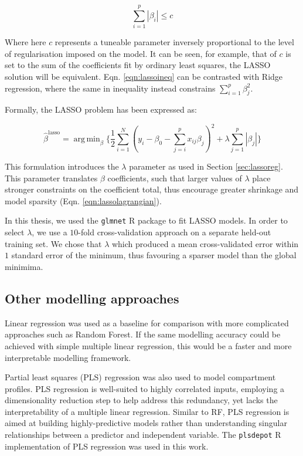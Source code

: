 \documentclass[a4paper,11pt,oneside]{book}
\DeclareMathOperator*{\argmin}{arg\,min}
\begin{document}
\begin{equation}\label{eqn:lassoineq}
\sum\limits_{i=1}^{p} |\beta_i| \leq c
\end{equation} \vspace{.2em}

Where here $c$ represents a tuneable parameter inversely proportional to the level of regularisation imposed on the model. It can be seen, for example, that of $c$ is set to the sum of the coefficients fit by ordinary least squares, the LASSO solution will be equivalent. Eqn. \ref{eqn:lassoineq} can be contrasted with Ridge regression, where the same in inequality instead constrains $\sum_{i=1}^{p} \beta_j^2$.

Formally, the LASSO problem has been expressed as:\cite{Hastie2001}

\begin{equation}\label{eqn:lassolagrangian}
\hat{\beta}^\mathrm{lasso} = \argmin_\beta \bigg\{ 
\frac{1}{2} \sum_{i=1}^N (y_i - \beta_0 - \sum_{j=i}^p x_{ij}\beta_j)^2 
+ \lambda \sum_{j=1}^p |\beta_j|
\bigg\}
\end{equation} \vspace{.2em}

This formulation introduces the $\lambda$ parameter as used in Section \ref{sec:lassoreg}. This parameter translates $\beta$ coefficients, such that larger values of $\lambda$ place stronger constraints on the coefficient total, thus encourage greater shrinkage and model sparsity (Eqn. \ref{eqn:lassolagrangian}).

In this thesis, we used the \texttt{glmnet} R package to fit LASSO models.\cite{glmnet1, glmnet2} In order to select $\lambda$, we use a $10$-fold cross-validation approach on a separate held-out training set. We chose that $\lambda$ which produced a mean cross-validated error within $1$ standard error of the minimum, thus favouring a sparser model than the global minimima.

\subsection{Other modelling approaches}\label{meth:othermodels}
 
Linear regression was used as a baseline for comparison with more complicated approaches such as Random Forest. If the same modelling accuracy could be achieved with simple multiple linear regression, this would be a faster and more interpretable modelling framework.

Partial least squares (PLS) regression was also used to model compartment profiles. PLS regression is well-suited to highly correlated inputs, employing a dimensionality reduction step to help address this redundancy, yet lacks the interpretability of a multiple linear regression. Similar to RF, PLS regression is aimed at building highly-predictive models rather than understanding singular relationships between a predictor and independent variable.\cite{Tobias1995} The \texttt{plsdepot} R implementation of PLS regression was used in this work.
\end{document}
